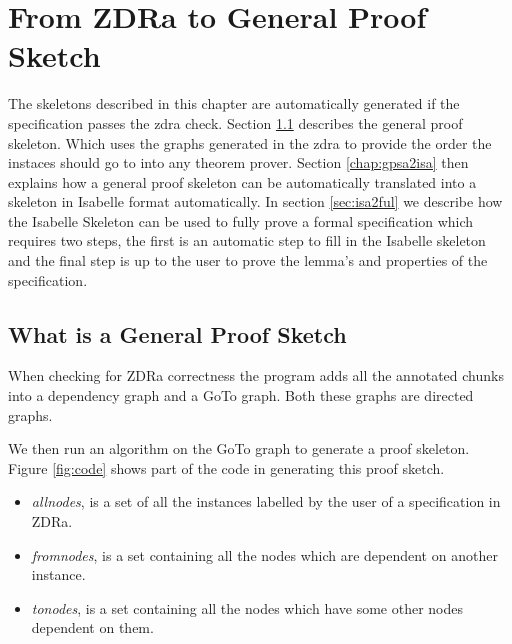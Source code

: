 \chapter{From ZDRa to General Proof Sketch}
\label{ch:skeletons}

The skeletons described in this chapter are automatically generated if the specification passes the \gls{zdra} check. Section \ref{sec:zdra2gen} describes the general proof skeleton. Which uses the graphs generated in the \gls{zdra} to provide the order the instaces should go to into any theorem prover. Section \ref{chap:gpsa2isa} then explains how a general proof skeleton can be automatically translated into a skeleton in Isabelle format automatically. In section \ref{sec:isa2ful} we describe how the Isabelle Skeleton can be used to fully prove a formal specification which requires two steps, the first is an automatic step to fill in the Isabelle skeleton and the final step is up to the user to prove the lemma's and properties of the specification.

\section{What is a General Proof Sketch}
\label{sec:zdra2gen}

When checking for ZDRa correctness the program adds all the annotated chunks into a dependency graph and a GoTo graph. Both these graphs are directed graphs.

We then run an algorithm on the GoTo graph to generate a proof skeleton. Figure \ref{fig:code} shows part of the code in generating this proof sketch.

\begin{itemize}
\item \textit{allnodes}, is a set of all the instances labelled by the user of a specification in ZDRa.

\item \textit{fromnodes}, is a set containing all the nodes which are dependent on another instance.

\item \textit{tonodes}, is a set containing all the nodes which have some other nodes dependent on them.
\end{itemize}


